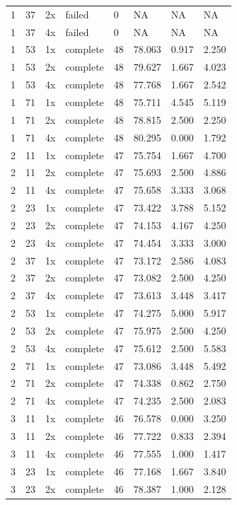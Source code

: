 \begin{longtable}{llllllll}
1 & 37 & 2x & failed & 0 & NA & NA & NA \\
1 & 37 & 4x & failed & 0 & NA & NA & NA \\
1 & 53 & 1x & complete & 48 & 78.063 & 0.917 & 2.250 \\
1 & 53 & 2x & complete & 48 & 79.627 & 1.667 & 4.023 \\
1 & 53 & 4x & complete & 48 & 77.768 & 1.667 & 2.542 \\
1 & 71 & 1x & complete & 48 & 75.711 & 4.545 & 5.119 \\
1 & 71 & 2x & complete & 48 & 78.815 & 2.500 & 2.250 \\
1 & 71 & 4x & complete & 48 & 80.295 & 0.000 & 1.792 \\
2 & 11 & 1x & complete & 47 & 75.754 & 1.667 & 4.700 \\
2 & 11 & 2x & complete & 47 & 75.693 & 2.500 & 4.886 \\
2 & 11 & 4x & complete & 47 & 75.658 & 3.333 & 3.068 \\
2 & 23 & 1x & complete & 47 & 73.422 & 3.788 & 5.152 \\
2 & 23 & 2x & complete & 47 & 74.153 & 4.167 & 4.250 \\
2 & 23 & 4x & complete & 47 & 74.454 & 3.333 & 3.000 \\
2 & 37 & 1x & complete & 47 & 73.172 & 2.586 & 4.083 \\
2 & 37 & 2x & complete & 47 & 73.082 & 2.500 & 4.250 \\
2 & 37 & 4x & complete & 47 & 73.613 & 3.448 & 3.417 \\
2 & 53 & 1x & complete & 47 & 74.275 & 5.000 & 5.917 \\
2 & 53 & 2x & complete & 47 & 75.975 & 2.500 & 4.250 \\
2 & 53 & 4x & complete & 47 & 75.612 & 2.500 & 5.583 \\
2 & 71 & 1x & complete & 47 & 73.086 & 3.448 & 5.492 \\
2 & 71 & 2x & complete & 47 & 74.338 & 0.862 & 2.750 \\
2 & 71 & 4x & complete & 47 & 74.235 & 2.500 & 2.083 \\
3 & 11 & 1x & complete & 46 & 76.578 & 0.000 & 3.250 \\
3 & 11 & 2x & complete & 46 & 77.722 & 0.833 & 2.394 \\
3 & 11 & 4x & complete & 46 & 77.555 & 1.000 & 1.417 \\
3 & 23 & 1x & complete & 46 & 77.168 & 1.667 & 3.840 \\
3 & 23 & 2x & complete & 46 & 78.387 & 1.000 & 2.128 \\

\end{longtable}
